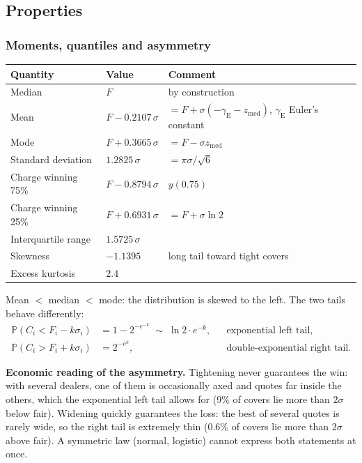 \documentclass[11pt,a4paper]{article}
\theoremstyle{definition}
\theoremstyle{remark}
\newcommand{\Prob}{\mathbb{P}}
\newcommand{\zm}{z_{\mathrm{med}}}
\begin{document}
\subsection{Properties}\label{sec:properties}

\subsubsection{Moments, quantiles and asymmetry}
\begin{center}
\begin{tabular}{lll}
\toprule
Quantity & Value & Comment \\
\midrule
Median & $F$ & by construction \\
Mean & $F-0.2107\,\sigma$ & $=F+\sigma(-\gamma_{\mathrm E}-\zm)$, $\gamma_{\mathrm E}$ Euler's constant \\
Mode & $F+0.3665\,\sigma$ & $=F-\sigma\zm$ \\
Standard deviation & $1.2825\,\sigma$ & $=\pi\sigma/\sqrt6$ \\
Charge winning 75\% & $F-0.8794\,\sigma$ & $y(0.75)$ \\
Charge winning 25\% & $F+0.6931\,\sigma$ & $=F+\sigma\ln 2$ \\
Interquartile range & $1.5725\,\sigma$ & \\
Skewness & $-1.1395$ & long tail toward tight covers \\
Excess kurtosis & $2.4$ & \\
\bottomrule
\end{tabular}
\end{center}
Mean $<$ median $<$ mode: the distribution is skewed to the left. The two tails behave differently:
\begin{align}
\Prob(C_i<F_i-k\sigma_i) &= 1-2^{-e^{-k}}\;\sim\;\ln 2\cdot e^{-k}, && \text{exponential left tail,}\label{eq:lefttail}\\
\Prob(C_i>F_i+k\sigma_i) &= 2^{-e^{k}}, && \text{double-exponential right tail.}\label{eq:righttail}
\end{align}
\begin{decision}
\textbf{Economic reading of the asymmetry.} Tightening never guarantees the win: with several dealers, one of them is occasionally axed and quotes far inside the others, which the exponential left tail allows for (9\% of covers lie more than $2\sigma$ below fair). Widening quickly guarantees the loss: the best of several quotes is rarely wide, so the right tail is extremely thin (0.6\% of covers lie more than $2\sigma$ above fair). A symmetric law (normal, logistic) cannot express both statements at once.
\end{decision}
\end{document}
